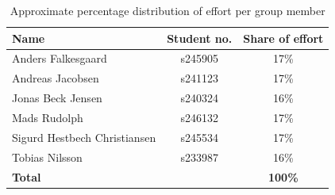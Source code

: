 \documentclass{article}
\begin{document}
\begin{table}[H]
    \centering
    \begin{tabular}{l|c|c}
        \textbf{Name} & \textbf{Student no.} & \textbf{Share of effort} \\
        \hline
        Anders Falkesgaard            & s245905 & 17\% \\
        Andreas Jacobsen              & s241123 & 17\% \\
        Jonas Beck Jensen             & s240324 & 16\% \\
        Mads Rudolph                  & s246132 & 17\% \\
        Sigurd Hestbech Christiansen  & s245534 & 17\% \\
        Tobias Nilsson                & s233987 & 16\% \\
        \hline
        \textbf{Total}                &         & \textbf{100\%}\\
    \end{tabular}
    \caption{Approximate percentage distribution of effort per group member}
    \label{tab:tidsforbrug}
\end{table}

\ifdefined\mainfile\else
\end{document}
